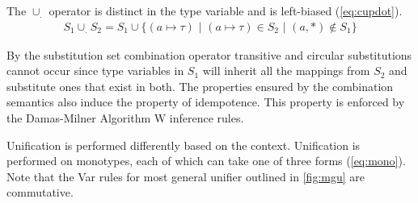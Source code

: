 \documentclass[11pt,oneside,a4paper]{report}
\begin{document}
The $\cup_.$ operator is distinct in the type variable and is left-biased (\autoref{eq:cupdot}).
\begin{align}
    S_1 \cup_. S_2 = S_1 \cup \{ (a \mapsto \tau) \,\,|\,\, (a \mapsto \tau) \in S_2 \,\,|\,\, (a, *) \notin S_1 \}
    \label{eq:cupdot}
\end{align}
\begin{remark}
By the substitution set combination operator transitive and circular substitutions cannot occur since type variables in $S_1$ will inherit all the mappings from $S_2$ and substitute ones that exist in both.
The properties ensured by the combination semantics also induce the property of idempotence.
This property is enforced by the Damas-Milner Algorithm W inference rules.
\end{remark}
Unification is performed differently based on the context.
Unification is performed on monotypes, each of which can take one of three forms (\autoref{eq:mono}).
Note that the Var rules for most general unifier outlined in \autoref{fig:mgu} are commutative.
\end{document}
